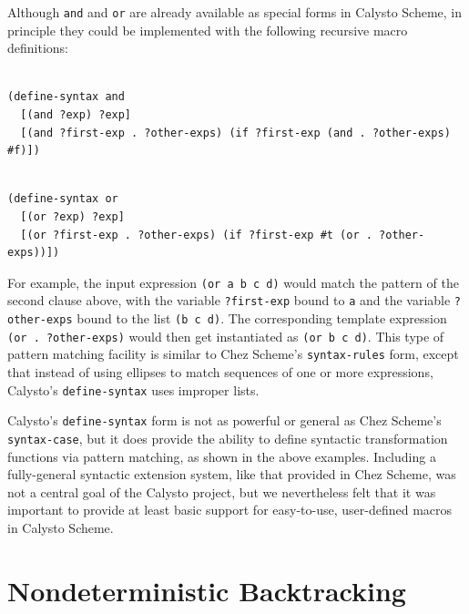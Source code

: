 \documentclass[acmsmall,screen,anonymous,review]{acmart}
\begin{document}
\noindent
Although \texttt{and} and \texttt{or} are already available as special forms in
Calysto Scheme, in principle they could be implemented with the following
recursive macro definitions:\\

\begin{minipage}{\textwidth}
\begin{verbatim}

(define-syntax and
  [(and ?exp) ?exp]
  [(and ?first-exp . ?other-exps) (if ?first-exp (and . ?other-exps) #f)])

\end{verbatim}
\end{minipage}

\begin{minipage}{\textwidth}
\begin{verbatim}

(define-syntax or
  [(or ?exp) ?exp]
  [(or ?first-exp . ?other-exps) (if ?first-exp #t (or . ?other-exps))])

\end{verbatim}
\end{minipage}

\noindent
For example, the input expression \texttt{(or a b c d)} would match the pattern
of the second clause above, with the variable \texttt{?first-exp} bound to
\texttt{a} and the variable \texttt{?other-exps} bound to the list
\texttt{(b~c~d)}. The corresponding template expression
\texttt{(or~.~?other-exps)} would then get instantiated as \texttt{(or~b~c~d)}.
This type of pattern matching facility is similar to Chez Scheme's
\texttt{syntax-rules} form, except that instead of using ellipses to match
sequences of one or more expressions, Calysto's \texttt{define-syntax} uses
improper lists.

Calysto's \texttt{define-syntax} form is not as powerful or general as Chez
Scheme's \texttt{syntax-case}, but it does provide the ability to define
syntactic transformation functions via pattern matching, as shown in the above
examples.  Including a fully-general syntactic extension system, like that
provided in Chez Scheme, was not a central goal of the Calysto project, but we
nevertheless felt that it was important to provide at least basic support for
easy-to-use, user-defined macros in Calysto Scheme.

\section{Nondeterministic Backtracking}
\end{document}
